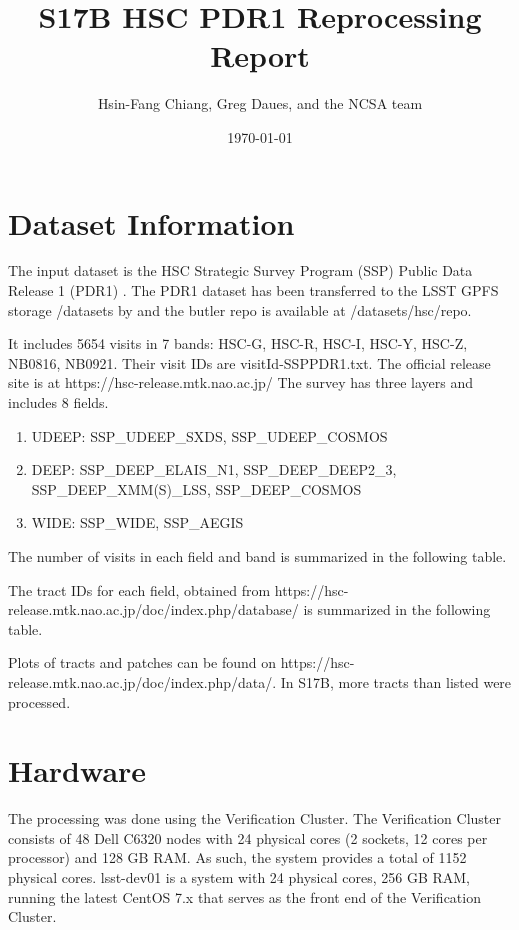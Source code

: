 \documentclass[DM,authoryear,toc]{lsstdoc}
\title{S17B HSC PDR1 Reprocessing Report}
\author{%
Hsin-Fang Chiang, Greg Daues, and the NCSA team
}
\date{\today}
\begin{document}
\maketitle

\section{Dataset Information}
The input dataset is the HSC Strategic Survey Program (SSP) Public Data Release 1 (PDR1) \citep{2017arXiv170208449A}.
The PDR1 dataset has been transferred to the LSST GPFS storage /datasets by  and the butler repo is available at /datasets/hsc/repo.

It includes 5654 visits in 7 bands: HSC-G, HSC-R, HSC-I, HSC-Y, HSC-Z, NB0816, NB0921. Their visit IDs are visitId-SSPPDR1.txt.  The official release site is at https://hsc-release.mtk.nao.ac.jp/
The survey has three layers and includes 8 fields.
\begin{enumerate}
\item
UDEEP: SSP{\_}UDEEP{\_}SXDS, SSP{\_}UDEEP{\_}COSMOS
\item
DEEP: SSP{\_}DEEP{\_}ELAIS{\_}N1, SSP{\_}DEEP{\_}DEEP2{\_}3, SSP{\_}DEEP{\_}XMM(S){\_}LSS, SSP{\_}DEEP{\_}COSMOS
\item
WIDE: SSP{\_}WIDE, SSP{\_}AEGIS
\end{enumerate}

The number of visits in each field and band is summarized in the following table.



The tract IDs for each field, obtained
from https://hsc-release.mtk.nao.ac.jp/doc/index.php/database/
is summarized in the following table.



Plots of tracts and patches can be found on  https://hsc-release.mtk.nao.ac.jp/doc/index.php/data/. In S17B, more tracts than listed were processed.

\section{Hardware}
The processing was done using the Verification Cluster.
The Verification Cluster consists of 48 Dell C6320 nodes with 24 physical cores (2 sockets, 12 cores per processor) and 128 GB RAM. As such, the system provides a total of 1152 physical cores.
lsst-dev01 is a system with 24 physical cores, 256 GB RAM, running the latest CentOS 7.x that serves as the front end of the Verification Cluster.
\end{document}
